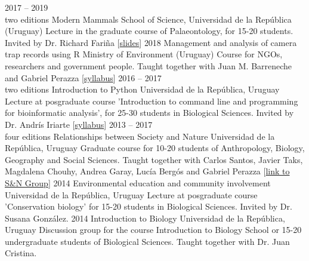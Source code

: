 \documentclass[9pt]{developercv} %
\begin{document}
\begin{entrylist}
	\entry
		{2017 -- 2019\\\footnotesize{two editions}}
		{Modern Mammals}
		{School of Science, Universidad de la Rep\'{u}blica (Uruguay)}
		{Lecture in the graduate course of Palaeontology, for 15-20 students. Invited by Dr. Richard Fari\~{n}a [\href{https://flograttarola.com/pdf/mamiferos_julana.pdf}{slides}]}
	\entry
		{2018}
		{Management and analysis of camera trap records using R}
		{Ministry of Environment (Uruguay)}
		{Course for NGOs, researchers and government people. Taught together with Juan M. Barreneche and Gabriel Perazza [\href{https://github.com/bienflorencia/curso_camtrapR}{syllabus}]}
	\entry
		{2016 -- 2017\\\footnotesize{two editions}}
		{Introduction to Python}
		{Universidad de la Rep\'{u}blica, Uruguay}
		{Lecture at posgraduate course 'Introduction to command line and programming for bioinformatic analysis', for 25-30 students in Biological Sciences. Invited by Dr. Andr\'{i}s Iriarte [\href{https://github.com/bienflorencia/clases_python}{syllabus}]}
	\entry
		{2013 -- 2017\\\footnotesize{four editions}}
		{Relationships between Society and Nature}
		{Universidad de la Rep\'{u}blica, Uruguay}
		{Graduate course for 10-20 students of Anthropology, Biology, Geography and Social Sciences. Taught together with Carlos Santos, Javier Taks, Magdalena Chouhy, Andrea Garay, Luc\'{i}a Berg\'{o}s and Gabriel Perazza [\href{https://udelar.edu.uy/retema/actividades/grupos-de-trabajo/}{link to S\&N Group}]}
	\entry
		{2014}
		{Environmental education and community involvement}
		{Universidad de la Rep\'{u}blica, Uruguay}
		{Lecture at posgraduate course 'Conservation biology' for 15-20 students in Biological Sciences. Invited by Dr. Susana Gonz\'{a}lez. }
	\entry
		{2014}
		{Introduction to Biology}
		{Universidad de la Rep\'{u}blica, Uruguay}
		{Discussion group for the course Introduction to Biology School or 15-20 undergraduate students of Biological Sciences. Taught together with Dr. Juan Cristina.}
\end{entrylist}

\end{document}
